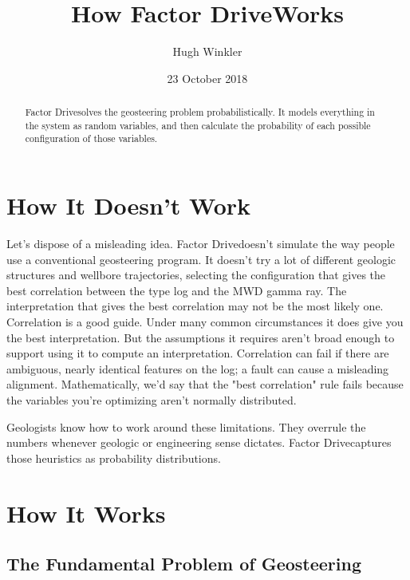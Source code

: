 \documentclass{tufte-handout}
\title{How Factor Drive\texttrademark Works}
\author[Hugh Winkler]{Hugh Winkler}
\date{23 October 2018}  %
\begin{document}
\maketitle%

\begin{abstract}
\noindent
Factor Drive\texttrademark solves the geosteering problem probabilistically.
It models everything in the system as random variables, and then  
calculate the probability of each possible configuration of those variables.
\end{abstract}




\section{How It Doesn't Work}\label{sec:how-it-doesnt-work}
Let's dispose of a misleading idea. 
Factor Drive\texttrademark doesn't simulate the way people use a conventional geosteering program.
It doesn't try a lot of different geologic structures and wellbore trajectories, selecting
the configuration that gives the best correlation between the type log and the MWD gamma ray. The
interpretation that gives the best
correlation may not be the most likely one.
Correlation is a good guide. Under many common circumstances it does give you the best
interpretation. But the assumptions it requires aren't broad enough to support using
it to compute an interpretation.
Correlation can fail if there are ambiguous, nearly identical features on the log; a fault can cause a misleading alignment. Mathematically, we'd say that the "best correlation" rule fails because the variables you're optimizing aren't normally distributed.

Geologists know how to work around these limitations. They overrule the numbers whenever geologic or engineering sense dictates. Factor Drive\texttrademark captures those heuristics as probability distributions.

\section{How It Works}\label{sec:how-it-doesnt-work}
\subsection{The Fundamental Problem of Geosteering}\label{sec:fundamental-problem}
\end{document}
